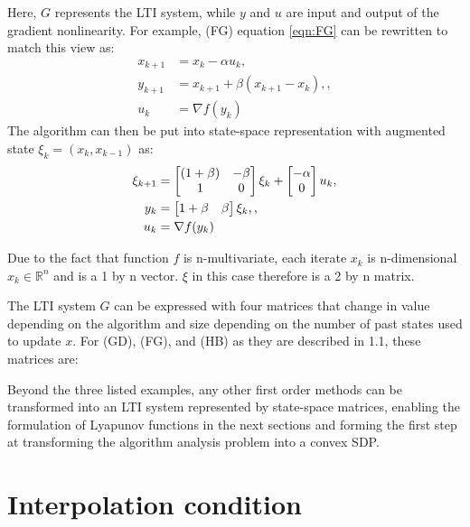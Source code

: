 Here, \(G\) represents the LTI system, while \(y\) and \(u\) are input and output of the gradient nonlinearity. For example, (FG) equation \ref{eqn:FG} can be rewritten to match this view as:
\begin{subequations} \label{eqn:FG2}
	\begin{align}
	  x_{k+1}     &=x_k-\alpha u_k \label{eq_FGstate},       \\
	  y_{k+1} &=x_{k+1}+\beta (x_{k+1}-x_k), \label{eq_FGinterpolated point}, \\
	  u_k &= \nabla f(y_k) \label{eq_FGggradient}
	\end{align}
\end{subequations}
The algorithm can then be put into state-space representation with augmented state $\xi _k = (x_k, x_{k-1})$ as:
\begin{subequations} \label{eqn:FGss }
	\begin{align}
	  \xi_{k+1} &= \begin{bmatrix}(1+\beta) & -\beta\\ 1 & 0\end{bmatrix}\xi_k  + \begin{bmatrix}-\alpha\\ 0\end{bmatrix}u_k \label{eq_FGssstate}, \\
	  y_k &= \begin{bmatrix}1+\beta & \beta\end{bmatrix}\xi_k, \label{eq_FGssinterpolation},\\
	  u_k &= \nabla f(y_k) \label{eq_FGssgradient}
	\end{align}
\end{subequations}

Due to the fact that function $f$ is n-multivariate, each iterate $x_k$ is n-dimensional $x_k \in \mathbb{R}^n$ and is a 1 by n vector. $\xi $ in this case therefore is a 2 by n matrix.

The LTI system \(G\) can be expressed with four matrices that change in value depending on the algorithm and size depending on the number of past states used to update \(x\). For (GD), (FG), and (HB) as they are described in 1.1, these matrices are:

Beyond the three listed examples, any other first order methods can be transformed into an LTI system represented by state-space matrices, enabling the formulation of Lyapunov functions in the next sections and forming the first step at transforming the algorithm analysis problem into a convex SDP.

\section{Interpolation condition}

